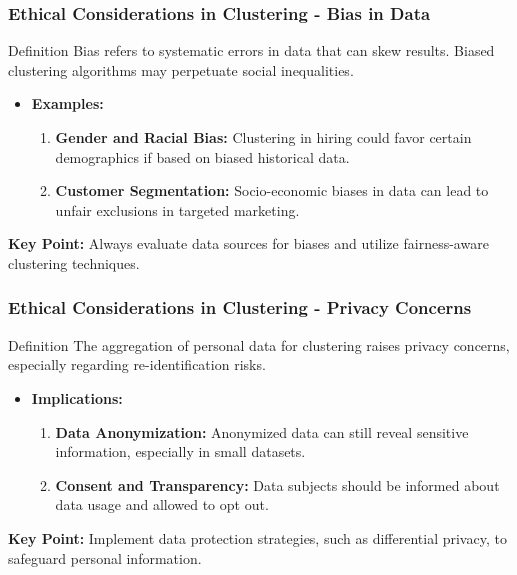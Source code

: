 \documentclass[aspectratio=169]{beamer}
\begin{document}
\begin{frame}[fragile]
    \frametitle{Ethical Considerations in Clustering - Bias in Data}
    \begin{block}{Definition}
        Bias refers to systematic errors in data that can skew results. Biased clustering algorithms may perpetuate social inequalities.
    \end{block}
    
    \begin{itemize}
        \item \textbf{Examples:}
        \begin{enumerate}
            \item \textbf{Gender and Racial Bias:} Clustering in hiring could favor certain demographics if based on biased historical data.
            \item \textbf{Customer Segmentation:} Socio-economic biases in data can lead to unfair exclusions in targeted marketing.
        \end{enumerate}
    \end{itemize}
    
    \textbf{Key Point:} Always evaluate data sources for biases and utilize fairness-aware clustering techniques.
\end{frame}

\begin{frame}[fragile]
    \frametitle{Ethical Considerations in Clustering - Privacy Concerns}
    \begin{block}{Definition}
        The aggregation of personal data for clustering raises privacy concerns, especially regarding re-identification risks.
    \end{block}
    
    \begin{itemize}
        \item \textbf{Implications:}
        \begin{enumerate}
            \item \textbf{Data Anonymization:} Anonymized data can still reveal sensitive information, especially in small datasets.
            \item \textbf{Consent and Transparency:} Data subjects should be informed about data usage and allowed to opt out.
        \end{enumerate}
    \end{itemize}
    
    \textbf{Key Point:} Implement data protection strategies, such as differential privacy, to safeguard personal information.
\end{frame}
\end{document}
